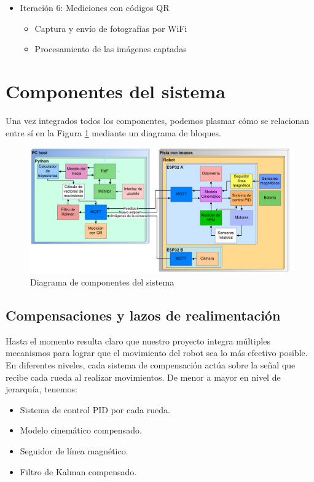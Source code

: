 \begin{itemize}
    \item Iteración 6: Mediciones con códigos QR
        \begin{itemize}
        \item Captura y envío de fotografías por WiFi
        \item Procesamiento de las imágenes captadas
    \end{itemize}
\end{itemize}


\section{Componentes del sistema}

Una vez integrados todos los componentes, podemos plasmar cómo se relacionan entre sí en la Figura \ref{fig:integsistemadiagcomp} mediante un diagrama de bloques.

\begin{figure}[H]
    \centering
    \hspace*{-1.0cm}
    \includegraphics[width=1.15\linewidth]{images/integ_sistema_general.png}
    \caption{Diagrama de componentes del sistema}
    \label{fig:integsistemadiagcomp}
\end{figure}


\subsection{Compensaciones y lazos de realimentación}

Hasta el momento resulta claro que nuestro proyecto integra múltiples mecanismos para lograr que el movimiento del robot sea lo más efectivo posible. En diferentes niveles, cada sistema de compensación actúa sobre la señal que recibe cada rueda al realizar movimientos. De menor a mayor en nivel de jerarquía, tenemos:

\begin{itemize}
    \item Sistema de control PID por cada rueda.
    \item Modelo cinemático compensado.
    \item Seguidor de línea magnético.
    \item Filtro de Kalman compensado.
\end{itemize}

